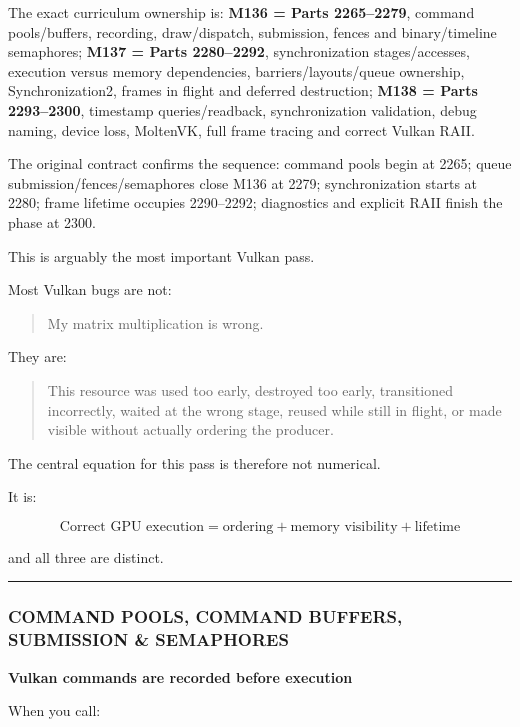The exact curriculum ownership is: \textbf{M136 = Parts 2265--2279}, command pools/buffers, recording, draw/dispatch, submission, fences and binary/timeline semaphores; \textbf{M137 = Parts 2280--2292}, synchronization stages/accesses, execution versus memory dependencies, barriers/layouts/queue ownership, Synchronization2, frames in flight and deferred destruction; \textbf{M138 = Parts 2293--2300}, timestamp queries/readback, synchronization validation, debug naming, device loss, MoltenVK, full frame tracing and correct Vulkan RAII.

The original contract confirms the sequence: command pools begin at 2265; queue submission/fences/semaphores close M136 at 2279; synchronization starts at 2280; frame lifetime occupies 2290--2292; diagnostics and explicit RAII finish the phase at 2300.

This is arguably the most important Vulkan pass.

Most Vulkan bugs are not:

\begin{quote}
My matrix multiplication is wrong.
\end{quote}

They are:

\begin{quote}
This resource was used too early, destroyed too early, transitioned incorrectly, waited at the wrong stage, reused while still in flight, or made visible without actually ordering the producer.
\end{quote}

The central equation for this pass is therefore not numerical.

It is:

\[
\boxed{
\text{Correct GPU execution}
=
\text{ordering}
+
\text{memory visibility}
+
\text{lifetime}
}
\]

and all three are distinct.

\begin{center}\rule{0.5\linewidth}{0.5pt}\end{center}

\subsubsection{COMMAND POOLS, COMMAND BUFFERS, SUBMISSION \& SEMAPHORES}\label{command-pools-command-buffers-submission-semaphores}

\textbf{Vulkan commands are recorded before execution}

When you call:

